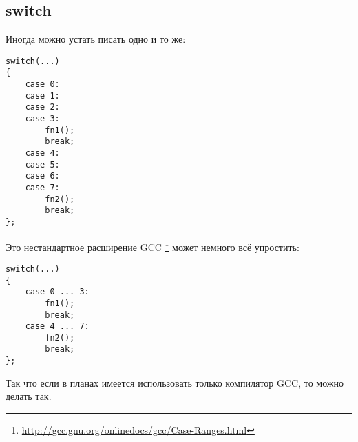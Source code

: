 ﻿\subsection{switch}

Иногда можно устать писать одно и то же:

\begin{lstlisting}
switch(...)
{
	case 0:
	case 1:
	case 2:
	case 3:
		fn1();
		break;
	case 4:
	case 5:
	case 6:
	case 7:
		fn2();
		break;
};
\end{lstlisting}

Это нестандартное расширение GCC
\footnote{\url{http://gcc.gnu.org/onlinedocs/gcc/Case-Ranges.html}} может немного всё упростить:

\begin{lstlisting}
switch(...)
{
	case 0 ... 3:
		fn1();
		break;
	case 4 ... 7:
		fn2();
		break;
};
\end{lstlisting}

Так что если в планах имеется использовать только компилятор GCC, то можно делать так.

